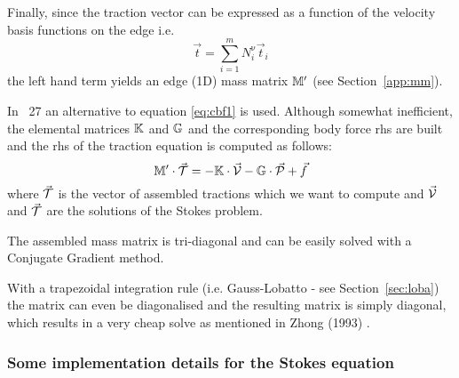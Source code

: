Finally, since the traction vector can be expressed as a function of the velocity 
basis functions on the edge i.e.
\[
\vec{t} = \sum_{i=1}^m N_i^\upnu \vec{t}_i
\]
the left hand term yields an edge (1D) mass matrix ${\mathbb{M}}'$ (see Section~\ref{app:mm}).

\begin{remark}
In \stone~27 an alternative to equation \ref{eq:cbf1} is used. Although
somewhat inefficient, the elemental matrices ${\mathbb{K}}$ and ${\mathbb{G}}$ and the corresponding 
body force rhs are built and the rhs of the traction equation is computed as follows:
\[
{\mathbb{M}}' \cdot \vec{\cal T} = -{\mathbb{K}} \cdot \vec{\cal V} - {\mathbb{G}} \cdot\vec{\cal P} + \vec{f}
\]
where $\vec{\cal T}$ is the vector of assembled tractions which we want to compute 
and $\vec{\cal V}$ and $\vec{\cal T}$ are the solutions of the Stokes problem. 
\end{remark}

\begin{remark} 
The assembled mass matrix is tri-diagonal and can be easily solved with 
a Conjugate Gradient method. 
\end{remark}

\begin{remark} 
With a trapezoidal integration rule 
(i.e. Gauss-Lobatto - see Section~\ref{sec:loba}) the matrix can even be diagonalised and the resulting 
matrix is simply diagonal, which results in a very cheap solve as mentioned in Zhong \etal (1993) \cite{zhgh93}.
\end{remark}







\subsubsection{Some implementation details for the Stokes equation}

